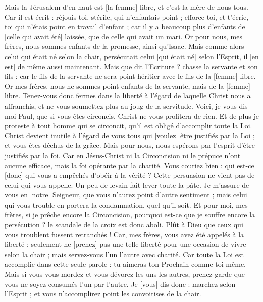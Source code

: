 \begin{multicols}{2}
Mais la Jérusalem d'en haut est [la femme] libre, et c'est la mère de nous tous.
Car il est écrit : réjouis-toi, stérile, qui n'enfantais point ; efforce-toi, et t'écrie, toi qui n'étais point en travail d'enfant ; car il y a beaucoup plus d'enfants de [celle qui avait été] laissée, que de celle qui avait un mari.
Or pour nous, mes frères, nous sommes enfants de la promesse, ainsi qu'Isaac.
Mais comme alors celui qui était né selon la chair, persécutait celui [qui était né] selon l'Esprit, il [en est] de même aussi maintenant.
Mais que dit l'Ecriture ? chasse la servante et son fils : car le fils de la servante ne sera point héritier avec le fils de la [femme] libre.
Or mes frères, nous ne sommes point enfants de la servante, mais de la [femme] libre.
\VerseOne{}Tenez-vous donc fermes dans la liberté à l'égard de laquelle Christ nous a affranchis, et ne vous soumettez plus au joug de la servitude.
Voici, je vous dis moi Paul, que si vous êtes circoncis, Christ ne vous profitera de rien.
Et de plus je proteste à tout homme qui se circoncit, qu'il est obligé d'accomplir toute la Loi.
Christ devient inutile à l'égard de vous tous qui [voulez] être justifiés par la Loi ; et vous êtes déchus de la grâce.
Mais pour nous, nous espérons par l'esprit d'être justifiés par la foi.
Car en Jésus-Christ ni la Circoncision ni le prépuce n'ont aucune efficace, mais la foi opérante par la charité.
Vous couriez bien : qui est-ce [donc] qui vous a empêchés d'obéir à la vérité ?
Cette persuasion ne vient pas de celui qui vous appelle.
Un peu de levain fait lever toute la pâte.
Je m'assure de vous en [notre] Seigneur, que vous n'aurez point d'autre sentiment ; mais celui qui vous trouble en portera la condamnation, quel qu'il soit.
Et pour moi, mes frères, si je prêche encore la Circoncision, pourquoi est-ce que je souffre encore la persécution ? le scandale de la croix est donc aboli.
Plût à Dieu que ceux qui vous troublent fussent retranchés !
Car, mes frères, vous avez été appelés à la liberté ; seulement ne [prenez] pas une telle liberté pour une occasion de vivre selon la chair ; mais servez-vous l'un l'autre avec charité.
Car toute la Loi est accomplie dans cette seule parole : tu aimeras ton Prochain comme toi-même.
Mais si vous vous mordez et vous dévorez les uns les autres, prenez garde que vous ne soyez consumés l'un par l'autre.
Je [vous] dis donc : marchez selon l'Esprit ; et vous n'accomplirez point les convoitises de la chair.

\end{multicols}
